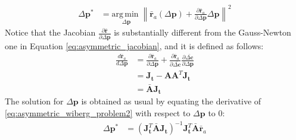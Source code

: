 \begin{equation}
    \begin{aligned}
        \Delta\mathbf{p}^* & = \underset{\Delta\mathbf{p}}{\mathrm{arg\,min\;}}  \left\| \bar{\mathbf{r}}_a(\Delta\mathbf{p}) + \frac{\partial \bar{\mathbf{r}}_a}{\partial\Delta\mathbf{p}} \Delta\mathbf{p} \right\|^2
    \label{eq:asymmetric_wiberg_problem2}
    \end{aligned}
\end{equation}
Notice that the Jacobian $\frac{\partial\bar{\mathbf{r}}}{\partial\Delta\mathbf{p}}$ is substantially different from the Gauss-Newton one in Equation \ref{eq:asymmetric_jacobian}, and it is defined as follows:
\begin{equation}
    \begin{aligned}
        \frac{d \bar{\mathbf{r}}_a}{d \Delta \mathbf{p}} & = \frac{\partial \bar{\mathbf{r}}_a}{\partial \Delta \mathbf{p}} + \frac{\partial \bar{\mathbf{r}}_a}{\partial \bar{\Delta \mathbf{c}}} \frac{\partial \bar{\Delta \mathbf{c}}}{\partial \Delta \mathbf{p}}
        \\
        & = \mathbf{J}_{\mathbf{t}} - \mathbf{A}\mathbf{A}^T\mathbf{J}_{\mathbf{t}}
        \\
        & = \bar{\mathbf{A}}\mathbf{J}_{\mathbf{t}}
    \label{eq:asymmetric_wiberg_jacobian}
    \end{aligned}
\end{equation}
 The solution for $\Delta\mathbf{p}$ is obtained as usual by equating the derivative of \ref{eq:asymmetric_wiberg_problem2} with respect to $\Delta\mathbf{p}$ to 0:
 \begin{equation}
    \begin{aligned}
    	\Delta \mathbf{p}^* & = \left( \mathbf{J}_{\mathbf{t}}^T \bar{\mathbf{A}} \mathbf{J}_{\mathbf{t}} \right)^{-1} \mathbf{J}_{\mathbf{t}}^T \bar{\mathbf{A}} \bar{\mathbf{r}}_a
    \label{eq:asymmetric_wiberg_solution}
    \end{aligned}
\end{equation}

